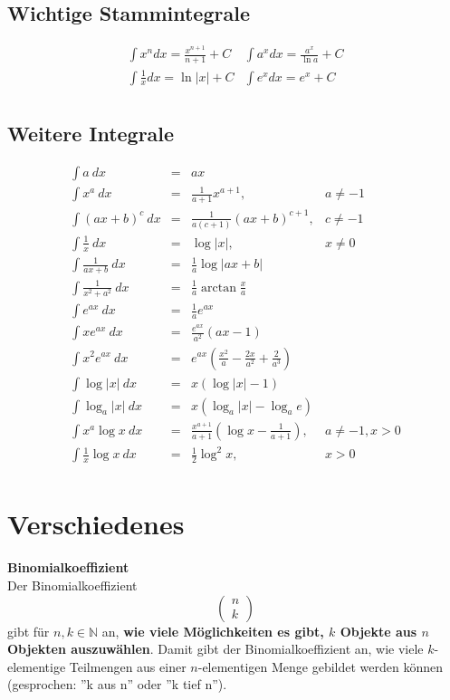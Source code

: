 \documentclass[10pt,a4paper,twocolumn]{article}
\begin{document}
\subsection{Wichtige Stammintegrale}
\renewcommand*{\arraystretch}{2}
\[
\begin{array}{cc}

	\int x^ndx=\frac{x^{n+1}}{n+1}+C & \int a^xdx=\frac{a^x}{\ln a}+C \\
	\int\frac{1}{x}dx=\ln |x|+C & \int e^xdx=e^x+C \\
\end{array}
\]
\renewcommand*{\arraystretch}{1}

\subsection{Weitere Integrale}
\[
\begin{array}{rcll}
\int a\ dx & = & ax & \\
\int x^a\ dx & = & \frac{1}{a+1} x^{a+1} , & a \neq -1 \\
\int (ax+b)^c\ dx & = & \frac{1}{a(c+1)}(ax+b)^{c+1}, & c \neq -1 \\
\int \frac{1}{x}\ dx & = & \log\left|x\right|, & x\neq 0 \\
\int \frac{1}{ax+b}\ dx & = & \frac{1}{a} \log\left|ax+b\right| & \\
\int \frac{1}{x^2+a^2}\ dx & = & \frac{1}{a}\arctan\frac{x}{a} & \\
%
%
\int e^{ax}\ dx & = & \frac{1}{a}e^{ax} & \\
\int x e^{ax}\ dx & = & \frac{e^{ax}}{a^2}(ax-1) & \\
\int x^2 e^{ax}\ dx & = & e^{ax}\left(\frac{x^2}{a}-\frac{2x}{a^2}+\frac{2}{a^3}\right) & \\
%
%
\int \log\left|x\right|\ dx & = & x(\log\left|x\right| - 1) & \\
\int \log_a\left|x\right|\ dx & = & x(\log_a\left|x\right|-\log_a e) & \\
\int x^a \log x\ dx & = & \frac{x^{a+1}}{a+1}\left(\log x - \frac{1}{a+1}\right), & a\neq-1,x>0 \\
\int \frac{1}{x}\log x\ dx & = & \frac{1}{2}\log^2 x, & x>0 \\
\end{array}
\]

\section{Verschiedenes}
\textbf{Binomialkoeffizient} \\
Der Binomialkoeffizient
\[
\left(
\begin{array}{c}
	n \\
	k
\end{array}
\right)
\]
gibt für $n,k\in\mathbb{N}$ an, \textbf{wie viele Möglichkeiten es gibt, $k$ Objekte aus $n$ Objekten auszuwählen}. Damit gibt der Binomialkoeffizient an, wie viele $k$-elementige Teilmengen aus einer $n$-elementigen Menge gebildet werden können (gesprochen: ''k aus n'' oder ''k tief n'').
\end{document}
